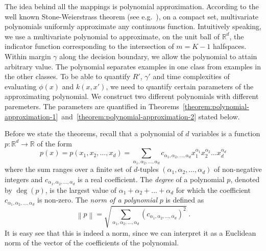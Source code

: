 \documentclass[12pt]{article}
\newcommand{\R}{\mathbb{R}}  %
\newcommand{\norm}[1]{\left\| #1 \right\|}  %
\begin{document}
The idea behind all the mappings is polynomial approximation. According to the
well known Stone-Weierstrass theorem (see
e.g.~\citep[Section~10.10]{Davidson-Donsig-2010}), on a compact set,
multivariate polynomials uniformly approximate any continuous function.
Intuitively speaking, we use a multivariate polynomial to approximate, on the
unit ball of $\R^d$, the indicator function corresponding to the intersection of
$m=K-1$ halfspaces. Within margin $\gamma$ along the decision boundary, we allow
the polynomial to attain arbitrary value. The polynomial separates examples in
one class from examples in the other classes. To be able to quantify $R'$,
$\gamma'$ and time complexities of evaluating $\phi(x)$ and $k(x,x')$, we need
to quantify certain parameters of the approximating polynomial. We construct two
different polynomials with different paremeters. The parameters are quantified
in
Theorems~\ref{theorem:polynomial-approximation-1}~and~\ref{theorem:polynomial-approximation-2}
stated below.

Before we state the theorems, recall that a polynomial of $d$ variables is a
function $p:\R^d \to \R$ of the form
$$
p(x) = p(x_1, x_2, \dots, x_d) = \sum_{\alpha_1, \alpha_2, \dots, \alpha_d} c_{\alpha_1, \alpha_2, \dots, \alpha_d} x_1^{\alpha_1} x_2^{\alpha_2} \dots x_d^{\alpha_d}
$$
where the sum ranges over a finite set of $d$-tuples $(\alpha_1, \alpha_2,
\dots, \alpha_d)$ of non-negative integers and $c_{\alpha_1, \alpha_2, \dots,
\alpha_d}$ is a real coefficient. The \emph{degree} of a polynomial $p$, denoted
by $\deg(p)$, is the largest value of $\alpha_1 + \alpha_2 + \dots + \alpha_d$
for which the coefficient $c_{\alpha_1, \alpha_2, \dots, \alpha_d}$ is non-zero.
The \emph{norm of a polynomial} $p$ is defined as
$$
\norm{p} = \sqrt{\sum_{\alpha_1, \alpha_2, \dots, \alpha_d} \left(c_{\alpha_1, \alpha_2, \dots, \alpha_d} \right)^2 } \; .
$$
It is easy see that this is indeed a norm, since we can interpret it as a
Euclidean norm of the vector of the coefficients of the polynomial.
\end{document}
